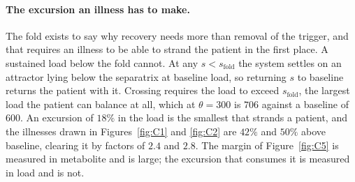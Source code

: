 \paragraph{The excursion an illness has to make.} The fold exists to say why recovery needs
more than removal of the trigger, and that requires an illness to be able to strand the
patient in the first place. A sustained load below the fold cannot. At any
$s < s_{\mathrm{fold}}$ the system settles on an attractor lying below the separatrix at
baseline load, so returning $s$ to baseline returns the patient with it. Crossing requires
the load to exceed $s_{\mathrm{fold}}$, the largest load the patient can balance at all,
which at $\theta = 300$ is $706$ against a baseline of $600$. An excursion of
$18\%$ in the load is the smallest that strands a patient, and the illnesses drawn in
Figures~\ref{fig:C1} and \ref{fig:C2} are $42\%$ and $50\%$ above baseline, clearing it by
factors of $2.4$ and $2.8$. The margin of Figure~\ref{fig:C5} is measured in metabolite and
is large; the excursion that consumes it is measured in load and is not.

